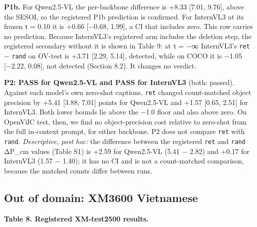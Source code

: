 \textbf{P1b.} For Qwen2.5-VL the per-backbone difference is +8.33 {[}7.01, 9.76{]}, above the SESOI,
so the registered P1b prediction is confirmed. For InternVL3 at its frozen τ = 0.10 it is +0.66
{[}−0.68, 1.99{]}, a CI that includes zero. This row carries no prediction. Because InternVL3's
registered arm includes the deletion step, the registered secondary without it is shown in Table 9:
at τ = −∞ InternVL3's \texttt{ret} − \texttt{rand} on OV-test is +3.71 {[}2.29, 5.14{]}, detected,
while on COCO it is −1.05 {[}−2.22, 0.08{]}, not detected (Section 8.2). It changes no verdict.

\textbf{P2: PASS for Qwen2.5-VL and PASS for InternVL3} (both: passed). Against each model's own
zero-shot captions, \texttt{ret} changed count-matched object precision by +5.41 {[}3.88, 7.01{]}
points for Qwen2.5-VL and +1.57 {[}0.65, 2.51{]} for InternVL3. Both lower bounds lie above the −1.0
floor and also above zero. On OpenViIC test, then, we find no object-precision cost relative to
zero-shot from the full in-context prompt, for either backbone. P2 does not compare \texttt{ret}
with \texttt{rand}. \emph{Descriptive, post hoc:} the difference between the registered \texttt{ret}
and \texttt{rand} ΔP\_cm values (Table S1) is +2.59 for Qwen2.5-VL (5.41 − 2.82) and +0.17 for
InternVL3 (1.57 − 1.40); it has no CI and is not a count-matched comparison, because the matched
counts differ between runs.

\subsection{Out of domain: XM3600 Vietnamese}\label{out-of-domain-xm3600-vietnamese}

\textbf{Table 8. Registered XM-test2500 results.}

